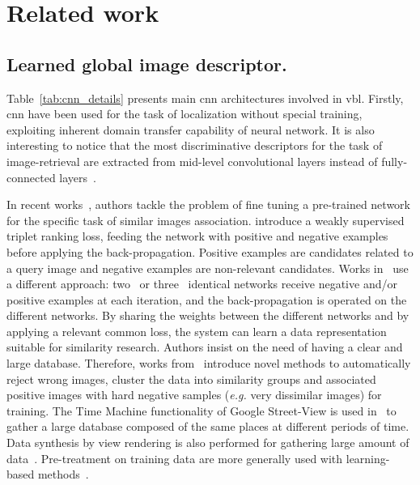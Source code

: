 \section{Related work}
\label{sec:cbir_data_for_loc}

\subsection{Learned global image descriptor.}
\label{subsec:cnn_as_global_desc}
Table~\ref{tab:cnn_details} presents main \ac{cnn} architectures involved in \ac{vbl}. Firstly, \ac{cnn} have been used for the task of localization without special training, exploiting inherent domain transfer capability of neural network. It is also interesting to notice that the most discriminative descriptors for the task of image-retrieval are extracted from mid-level convolutional layers instead of fully-connected layers~\citep{Babenko2014,Sunderhauf2015}.

In recent works~\citep{Arandjelovic2017,Radenovic2016, Gordo2016}, authors tackle the problem of fine tuning a pre-trained network for the specific task of similar images association. \citet{Arandjelovic2017} introduce a weakly supervised triplet ranking loss, feeding the network with positive and negative examples before applying the back-propagation. Positive examples are candidates related to a query image and negative examples are non-relevant candidates. Works in~\citep{Radenovic2016, Gordo2016} use a different approach: two~\citep{Radenovic2016} or three~\citep{Gordo2016} identical networks receive negative and/or positive examples at each iteration, and the back-propagation is operated on the different networks. By sharing the weights between the different networks and by applying a relevant common loss, the system can learn a data representation suitable for similarity research.	Authors insist on the need of having a clear and large database. Therefore, works from~\citep{Radenovic2016, Gordo2016} introduce novel methods to automatically reject wrong images, cluster the data into similarity groups and associated positive images with hard negative samples (\textit{e.g.} very dissimilar images) for training. The Time Machine functionality of Google Street-View is used in~\citep{Arandjelovic2017} to gather a large database composed of the same places at different periods of time. Data synthesis by view rendering is also performed for gathering large amount of data~\citep{Jia2016,Sizikova2016}.  Pre-treatment on training data are more generally used with learning-based methods~\citep{Kim2015,Cao2013}. 


